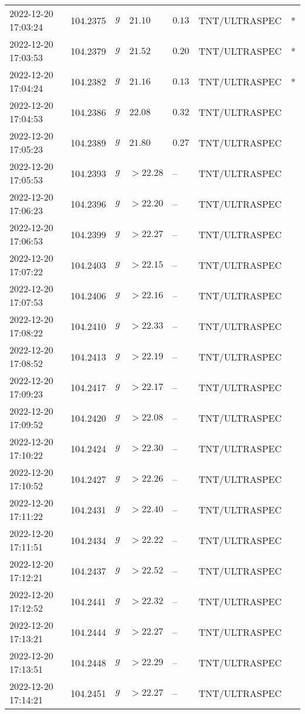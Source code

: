 \documentclass{nature_plusfigure}
\begin{document}
\begin{supplement}
\begin{center}
\begin{longtable}{lllllll}
2022-12-20 17:03:24 & 104.2375 & $g$ & $21.10$ & $0.13$ & TNT/ULTRASPEC & * \\ 
2022-12-20 17:03:53 & 104.2379 & $g$ & $21.52$ & $0.20$ & TNT/ULTRASPEC & * \\ 
2022-12-20 17:04:24 & 104.2382 & $g$ & $21.16$ & $0.13$ & TNT/ULTRASPEC & * \\ 
2022-12-20 17:04:53 & 104.2386 & $g$ & $22.08$ & $0.32$ & TNT/ULTRASPEC &  \\ 
2022-12-20 17:05:23 & 104.2389 & $g$ & $21.80$ & $0.27$ & TNT/ULTRASPEC &  \\ 
2022-12-20 17:05:53 & 104.2393 & $g$ & $>22.28$ & -- & TNT/ULTRASPEC &  \\ 
2022-12-20 17:06:23 & 104.2396 & $g$ & $>22.20$ & -- & TNT/ULTRASPEC &  \\ 
2022-12-20 17:06:53 & 104.2399 & $g$ & $>22.27$ & -- & TNT/ULTRASPEC &  \\ 
2022-12-20 17:07:22 & 104.2403 & $g$ & $>22.15$ & -- & TNT/ULTRASPEC &  \\ 
2022-12-20 17:07:53 & 104.2406 & $g$ & $>22.16$ & -- & TNT/ULTRASPEC &  \\ 
2022-12-20 17:08:22 & 104.2410 & $g$ & $>22.33$ & -- & TNT/ULTRASPEC &  \\ 
2022-12-20 17:08:52 & 104.2413 & $g$ & $>22.19$ & -- & TNT/ULTRASPEC &  \\ 
2022-12-20 17:09:23 & 104.2417 & $g$ & $>22.17$ & -- & TNT/ULTRASPEC &  \\ 
2022-12-20 17:09:52 & 104.2420 & $g$ & $>22.08$ & -- & TNT/ULTRASPEC &  \\ 
2022-12-20 17:10:22 & 104.2424 & $g$ & $>22.30$ & -- & TNT/ULTRASPEC &  \\ 
2022-12-20 17:10:52 & 104.2427 & $g$ & $>22.26$ & -- & TNT/ULTRASPEC &  \\ 
2022-12-20 17:11:22 & 104.2431 & $g$ & $>22.40$ & -- & TNT/ULTRASPEC &  \\ 
2022-12-20 17:11:51 & 104.2434 & $g$ & $>22.22$ & -- & TNT/ULTRASPEC &  \\ 
2022-12-20 17:12:21 & 104.2437 & $g$ & $>22.52$ & -- & TNT/ULTRASPEC &  \\ 
2022-12-20 17:12:52 & 104.2441 & $g$ & $>22.32$ & -- & TNT/ULTRASPEC &  \\ 
2022-12-20 17:13:21 & 104.2444 & $g$ & $>22.27$ & -- & TNT/ULTRASPEC &  \\ 
2022-12-20 17:13:51 & 104.2448 & $g$ & $>22.29$ & -- & TNT/ULTRASPEC &  \\ 
2022-12-20 17:14:21 & 104.2451 & $g$ & $>22.27$ & -- & TNT/ULTRASPEC &  \\ 

\end{longtable}
\end{center}
\end{supplement}
\end{document}
